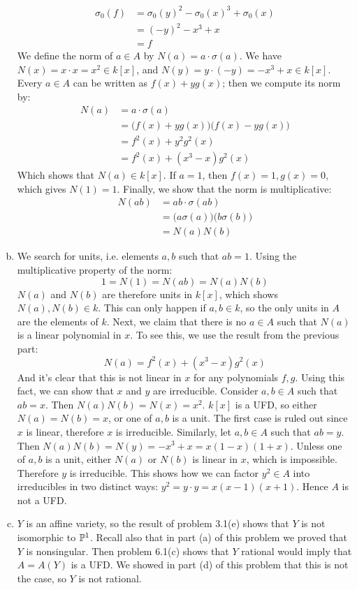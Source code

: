 \documentclass{mathnotes}
\begin{document}
\begin{enumerate}[(a)]
	\begin{align*}	
	\sigma_0(f) &= \sigma_0(y)^2 - \sigma_0(x)^3 + \sigma_0(x) \\
	&= (-y)^2 - x^3 + x \\
	&= f 
	\end{align*}
	We define the norm of $a\in A$ by $N(a) = a \cdot \sigma(a)$. We have $N(x) = x \cdot x = x^2 \in k[x]$, and $N(y) =
	y \cdot (-y) = -x^3 + x \in k[x]$. Every $a \in A$ can be written as $f(x) + y g(x)$; then we compute its norm by:
	\begin{align*}
	N(a) &= a \cdot \sigma(a) \\
	&= \big(f(x) + y g(x)\big)\big(f(x) - y g(x)\big) \\
	&= f^2(x) + y^2 g^2(x) \\
	&= f^2(x) + (x^3 - x) g^2(x)
	\end{align*}
	Which shows that $N(a) \in k[x]$. If $a = 1$, then $f(x) = 1, g(x) = 0$, which gives $N(1) = 1$. Finally, we show that 
	the norm is multiplicative:
	\begin{align*}
	N(ab) &= a b \cdot \sigma (ab) \\
	&= \big(a\sigma(a)\big)\big(b\sigma(b)\big) \\
	&= N(a) N(b)
	\end{align*}
\item We search for units, i.e. elements $a,b$ such that $ab = 1$. Using the multiplicative property of the norm:
	\[	1= N(1) = N(ab) = N(a) N(b)	\]
	$N(a)$ and $N(b)$ are therefore units in $k[x]$, which shows $N(a), N(b) \in k$. This can only happen if $a,b \in k$, so
	the only units in $A$ are the elements of $k$. Next, we claim that there is no $a \in A$ such that $N(a)$ is a linear 
	polynomial in $x$. To see this, we use the result from the previous part:
	\[	N(a) = f^2(x) + (x^3 - x) g^2(x)	\] 
	And it's clear that this is not linear in $x$ for any polynomials $f,g$. Using this fact, we can show that $x$ and $y$ are
	irreducible. Consider $a,b \in A$ such that $ab = x$. Then $N(a) N(b) = N(x) = x^2$. $k[x]$ is a UFD, so either $N(a) 
	= N(b) = x$, or one of $a,b$ is a unit. The first case is ruled out since $x$ is linear, therefore $x$ is irreducible. Similarly,
	let $a,b \in A$ such that $ab = y$. Then $N(a) N(b) = N(y) = - x^3 + x = x(1-x)(1+x)$. Unless one of $a,b$ is a unit, either
	$N(a)$ or $N(b)$ is linear in $x$, which is impossible. Therefore $y$ is irreducible. This shows how we can factor $y^2 
	\in A$ into irreducibles in two distinct ways: $y^2 = y \cdot y = x(x-1)(x+1)$. Hence $A$ is not a UFD.
\item $Y$ is an affine variety, so the result of problem 3.1(e) shows that $Y$ is not isomorphic to $\mathbb{P}^1$. Recall also that in
	part (a) of this problem we proved that $Y$ is nonsingular. Then problem 6.1(c) shows that $Y$ rational would imply that
	$A = A(Y)$ is a UFD. We showed in part (d) of this problem that this is not the case, so $Y$ is not rational.
\end{enumerate}
\end{document}
